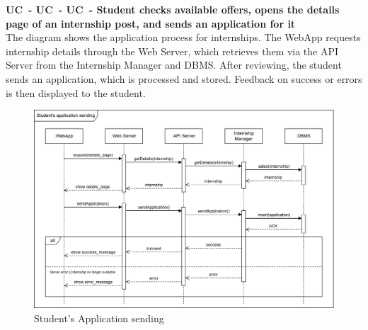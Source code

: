 \textbf{UC\cuc\ - UC\cuc\ - UC\cuc\  - Student checks available offers, opens the details page of an internship post, and sends an application for it} \\
The diagram shows the application process for internships. The WebApp requests internship details through the Web Server, which retrieves them via the API Server from the Internship Manager and DBMS. After reviewing, the student sends an application, which is processed and stored. Feedback on success or errors is then displayed to the student.
\begin{center}
    \begin{figure}[H]
        \centering
        \includegraphics[width=1\linewidth]{Images/Sequence diagrams/UC567.png}
        \caption{Student's Application sending}
        \label{fig:enter-label}
    \end{figure}
\end{center}

